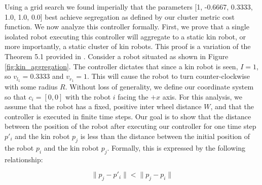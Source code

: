\documentclass[conference]{IEEEtran}
\begin{document}
    Using a grid search we found imperially that the parameters [1, -0.6667, 0.3333, 1.0, 1.0, 0.0] best achieve segregation as defined by our cluster metric cost function. We now analyze this controller formally. First, we prove that a single isolated robot executing this controller will aggregate to a static kin robot, or more importantly, a static cluster of kin robots. This proof is a variation of the Theorem 5.1 provided in \cite{gauci_self-organized_2014}. Consider a robot situated as shown in Figure \ref{fig:kin_aggregation}. The controller dictates that since a kin robot is seen, $I=1$, so $v_{l_1} = 0.3333$ and $v_{r_1} = 1$. This will cause the robot to turn counter-clockwise with some radius $R$. Without loss of generality, we define our coordinate system so that $c_i=[0,0]$ with the robot $i$ facing the $+x$ axis. For this analysis, we assume that the robot has a fixed, positive inter wheel distance $W$, and that the controller is executed in finite time steps. Our goal is to show that the distance between the position of the robot after executing our controller for one time step $p'_i$ and the kin robot $p_j$ is less than the distance between the initial position of the robot $p_i$ and the kin robot $p_j$. Formally, this is expressed by the following relationship:

    \begin{equation} \label{eq:agg}
      \lVert p_j - p'_i \rVert < \lVert p_j - p_i \rVert
    \end{equation}
\end{document}
